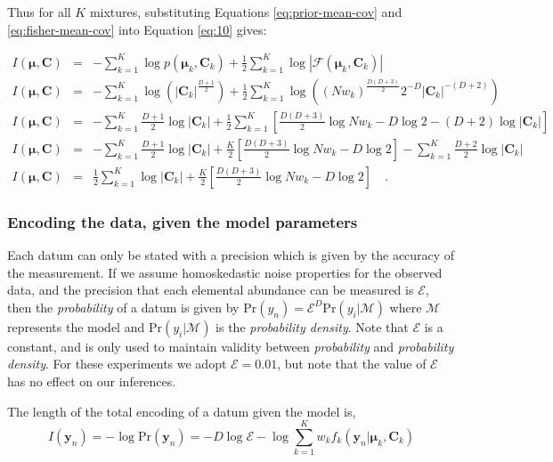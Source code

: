 \documentclass{aastex61}
\newcommand{\vect}[1]{\boldsymbol{\mathbf{#1}}}
\def\veccov{\vect{C}}
\def\vecmean{\vect{\mu}}
\def\weight{w}
\def\datum{y}
\def\data{\vect{\datum}}
\begin{document}
Thus for all $K$ mixtures, substituting Equations \ref{eq:prior-mean-cov} and 
\ref{eq:fisher-mean-cov} into Equation \ref{eq:10} gives:

\begin{eqnarray}
I(\vecmean,\veccov) &=& -\sum_{k=1}^{K}\log{p(\vecmean_k,\veccov_k)} + \frac{1}{2}\sum_{k=1}^{K}\log{|\mathcal{F}\left(\vecmean_k,\veccov_k\right)|} \nonumber  \\
I(\vecmean,\veccov) &=& -\sum_{k=1}^{K}\log{\left(|\veccov_k|^{\frac{D + 1}{2}}\right)}
    + \frac{1}{2}\sum_{k=1}^{K}\log{\left((N\weight_k)^\frac{D(D+3)}{2}2^{-D}|\veccov_k|^{-(D+2)}\right)} \nonumber \\
I(\vecmean,\veccov) &=& -\sum_{k=1}^{K}\frac{D + 1}{2}\log|\veccov_k|
 + \frac{1}{2}\sum_{k=1}^{K}\left[\frac{D(D+3)}{2}\log{N\weight_k} -D\log{2} -(D+2)\log|\veccov_k|\right] \nonumber \\
I(\vecmean,\veccov) &=& -\sum_{k=1}^{K}\frac{D + 1}{2}\log|\veccov_k|
 + \frac{K}{2}\left[\frac{D\left(D+3\right)}{2}\log{N\weight_k} - D\log{2}\right]
 -\sum_{k=1}^{K}\frac{D+2}{2}\log|\veccov_k| \nonumber \\
I(\vecmean,\veccov) &=& \frac{1}{2}\sum_{k=1}^{K}\log|\veccov_k|
 + \frac{K}{2}\left[\frac{D\left(D+3\right)}{2}\log{N\weight_k} - D\log{2}\right] \quad .
\end{eqnarray}



\subsubsection{Encoding the data, given the model parameters}
\label{sec:encoding-data}


Each datum can only be stated with a precision which is given by the accuracy
of the measurement.
If we assume homoskedastic noise properties for the observed data, and the
precision that each elemental abundance can be measured is $\mathcal{E}$, then
the \emph{probability} of a datum is given by 
$\textrm{Pr}(\datum_n) = \mathcal{E}^D\textrm{Pr}(\datum_i|\mathcal{M})$
where $\mathcal{M}$ represents the model and $\textrm{Pr}(\datum_i|\mathcal{M})$
is the \emph{probability density}.
Note that $\mathcal{E}$ is a constant, and is only used to maintain validity 
between \emph{probability} and \emph{probability density}.
For these experiments we adopt $\mathcal{E} = 0.01$, but note that the value of
$\mathcal{E}$ has no effect on our inferences.

The length of the total encoding of a datum given the model is,
\begin{equation}
  I(\data_n) = -\log{\textrm{Pr}(\data_n)} = -D\log\mathcal{E} - \log\sum_{k=1}^{K}\weight_{k}f_{k}(\data_n|\vecmean_k,\veccov_k)
\end{equation}
\end{document}
